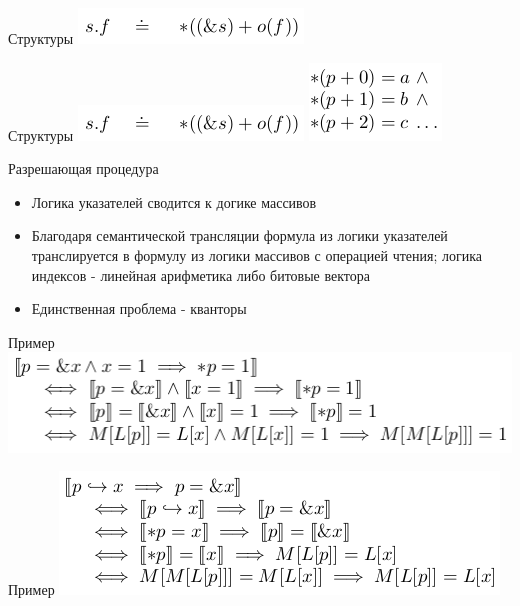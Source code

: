 \documentclass{beamer}
\begin{document}
\begin{frame}{Структуры}
\includegraphics[scale=0.5]{struct1.png}\newline
\end{frame}

\begin{frame}{Структуры}
\includegraphics[scale=0.5]{struct1.png}\newline
\includegraphics[scale=0.5]{struct2.png}\newline
\end{frame}

\begin{frame}{Разрешающая процедура}
\begin{itemize}
\item Логика указателей сводится к догике массивов
\item Благодаря семантической трансляции формула из логики указателей транслируется в формулу из логики массивов с операцией
чтения; логика индексов - линейная арифметика либо битовые вектора
\item Единственная проблема - кванторы
\end{itemize}
\end{frame}

\begin{frame}{Пример}
\includegraphics[scale=0.5]{ex_good.png}\newline
\end{frame}

\begin{frame}{Пример}
\includegraphics[scale=0.5]{ex_bad1.png}\newline
\end{frame}
\end{document}

